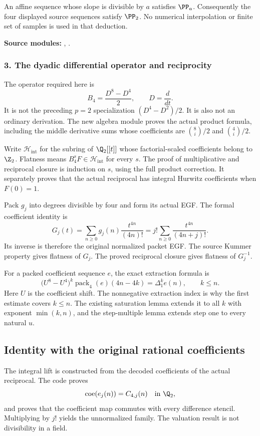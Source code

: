 An affine sequence whose slope is divisible by $a$ satisfies $\PP_a$. Consequently the four displayed source sequences satisfy $\PP_2$. No numerical interpolation or finite set of samples is used in that deduction.

\textbf{Source modules:} , .

\par\medskip
\subsubsection*{3. The dyadic differential operator and reciprocity}
The operator required here is
\[
\boxed{B_4=\frac{D^8-D^4}{2},\qquad D=\frac{d}{dt}.}
\]
It is not the preceding $p=2$ specialization $(D^4-D^2)/2$. It is also not an ordinary derivation. The new algebra module proves the actual product formula, including the middle derivative sums whose coefficients are $\binom 8i/2$ and $\binom 4i/2$.

Write $\mathcal H_{\mathrm{int}}$ for the subring of $\Q_2[[t]]$ whose factorial-scaled coefficients belong to $\Z_2$. Flatness means $B_4^sF\in\mathcal H_{\mathrm{int}}$ for every $s$. The proof of multiplicative and reciprocal closure is induction on $s$, using the full product correction. It separately proves that the actual reciprocal has integral Hurwitz coefficients when $F(0)=1$.

Pack $g_j$ into degrees divisible by four and form its actual EGF. The formal coefficient identity is
\[
G_j(t)=\sum_{n\ge0}g_j(n)\frac{t^{4n}}{(4n)!}
       =j!\sum_{n\ge0}\frac{t^{4n}}{(4n+j)!}.
\]
Its inverse is therefore the original normalized packet EGF. The source Kummer property gives flatness of $G_j$. The proved reciprocal closure gives flatness of $G_j^{-1}$.

For a packed coefficient sequence $e$, the exact extraction formula is
\[
\bigl(U^8-U^4\bigr)^k\operatorname{pack}_4(e)(4n-4k)
 =\Delta_1^k e(n),\qquad k\le n.
\]
Here $U$ is the coefficient shift. The nonnegative extraction index is why the first estimate covers $k\le n$. The existing saturation lemma extends it to all $k$ with exponent $\min(k,n)$, and the step-multiple lemma extends step one to every natural $u$.

\subsection*{Identity with the original rational coefficients}
The integral lift is constructed from the decoded coefficients of the actual reciprocal. The code proves
\[
 \operatorname{coe}(e_j(n))=C_{4,j}(n)\quad\text{in }\Q_2,
\]
and proves that the coefficient map commutes with every difference stencil. Multiplying by $j!$ yields the unnormalized family. The valuation result is not divisibility in a field.

